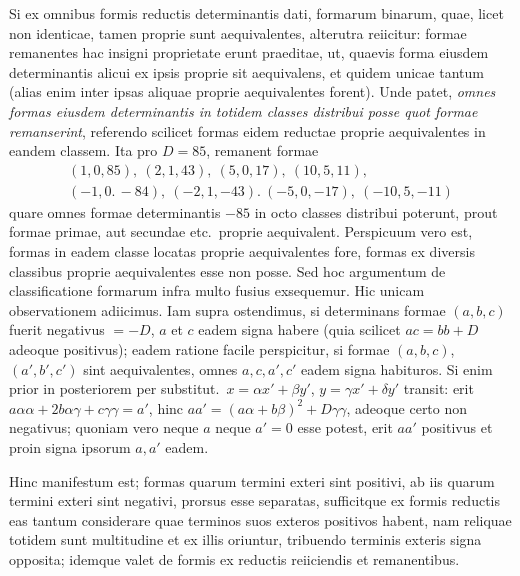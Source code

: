 Si ex omnibus formis reductis determinantis dati, formarum binarum, quae, licet non identicae, tamen proprie sunt aequivalentes, alterutra reiicitur: formae remanentes hac insigni proprietate erunt praeditae, ut, quaevis forma eiusdem determinantis alicui ex ipsis proprie sit aequivalens, et quidem unicae tantum (alias enim inter ipsas aliquae proprie aequivalentes forent). Unde patet, \emph{omnes formas eiusdem determinantis in totidem classes distribui posse quot formae remanserint}, referendo scilicet formas eidem reductae proprie aequivalentes in eandem classem. Ita pro $D=85$, remanent formae
\[
\begin{gathered}
(1,0,85),\ (2,1,43),\ (5,0,17),\ (10,5,11),\\
(-1,0.\,-84),\ (-2,1,-43).\ (-5,0,-17),\ (-10,5,-11)
\end{gathered}
\]
quare omnes formae determinantis $-85$ in octo classes distribui poterunt, prout formae primae, aut secundae etc.\ proprie aequivalent. Perspicuum vero est, formas in eadem classe locatas proprie aequivalentes fore, formas ex diversis classibus proprie aequivalentes esse non posse. Sed hoc argumentum de classificatione formarum infra multo fusius exsequemur. Hic unicam observationem adiicimus. Iam supra ostendimus, si determinans formae $(a,b,c)$ fuerit negativus $=-D$, $a$ et $c$ eadem signa habere (quia scilicet $ac=bb+D$ adeoque positivus); eadem ratione facile perspicitur, si formae $(a,b,c)$, $(a',b',c')$ sint aequivalentes, omnes $a,c,a',c'$ eadem signa habituros. Si enim prior in posteriorem per substitut.\ $x=\alpha x'+\beta y'$, $y=\gamma x'+\delta y'$ transit: erit $a\alpha\alpha+2b\alpha\gamma+c\gamma\gamma=a'$, hinc $aa'=(a\alpha+b\beta)^2+D\gamma\gamma$, adeoque certo non negativus; quoniam vero neque $a$ neque $a'=0$ esse potest, erit $aa'$ positivus et proin signa ipsorum $a,a'$ eadem.

Hinc manifestum est; formas quarum termini exteri sint positivi, ab iis quarum termini exteri sint negativi, prorsus esse separatas, sufficitque ex formis reductis eas tantum considerare quae terminos suos exteros positivos habent, nam
reliquae totidem sunt multitudine et ex illis oriuntur, tribuendo terminis exteris signa opposita; idemque valet de formis ex reductis reiiciendis et remanentibus.


